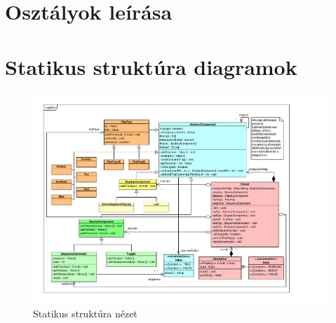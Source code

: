 \section{Osztályok leírása}




%

\section{Statikus struktúra diagramok}

\begin{figure}[H]
\begin{center}
\includegraphics*[angle=90, width=17cm, viewport = 30 30 730 565]{chapters/chapter04/classdiagram/class.pdf}
\caption{Statikus struktúra nézet}
\label{fig:class_diagram}
\end{center}
\end{figure}
%
%
%

